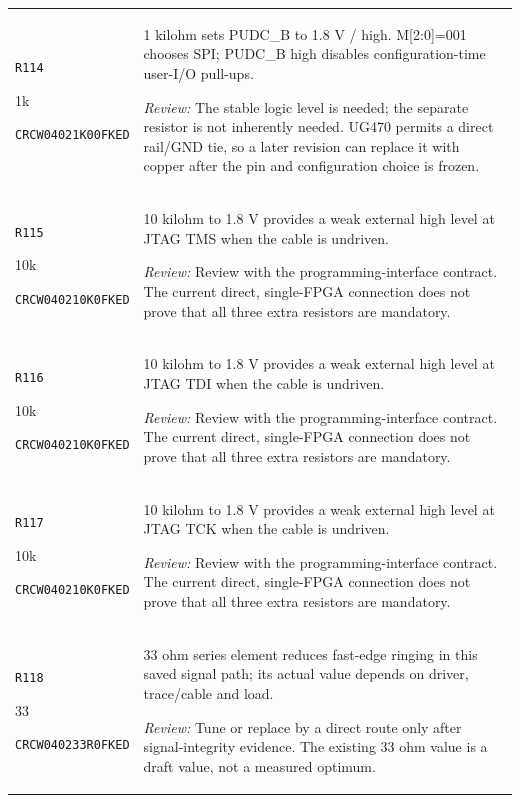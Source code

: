 \documentclass[10pt,a4paper]{article}
\begin{document}
\begin{longtable}{@{}P{46mm}P{117mm}@{}}
\nolinkurl{R114}\par 1k\par\scriptsize \nolinkurl{CRCW04021K00FKED} & 1 kilohm sets PUDC\_B to 1.8 V / high. M[2:0]=001 chooses SPI; PUDC\_B high disables configuration-time user-I/O pull-ups.\par\smallskip\textit{Review:} The stable logic level is needed; the separate resistor is not inherently needed. UG470 permits a direct rail/GND tie, so a later revision can replace it with copper after the pin and configuration choice is frozen. \\
\nolinkurl{R115}\par 10k\par\scriptsize \nolinkurl{CRCW040210K0FKED} & 10 kilohm to 1.8 V provides a weak external high level at JTAG TMS when the cable is undriven.\par\smallskip\textit{Review:} Review with the programming-interface contract. The current direct, single-FPGA connection does not prove that all three extra resistors are mandatory. \\
\nolinkurl{R116}\par 10k\par\scriptsize \nolinkurl{CRCW040210K0FKED} & 10 kilohm to 1.8 V provides a weak external high level at JTAG TDI when the cable is undriven.\par\smallskip\textit{Review:} Review with the programming-interface contract. The current direct, single-FPGA connection does not prove that all three extra resistors are mandatory. \\
\nolinkurl{R117}\par 10k\par\scriptsize \nolinkurl{CRCW040210K0FKED} & 10 kilohm to 1.8 V provides a weak external high level at JTAG TCK when the cable is undriven.\par\smallskip\textit{Review:} Review with the programming-interface contract. The current direct, single-FPGA connection does not prove that all three extra resistors are mandatory. \\
\nolinkurl{R118}\par 33\par\scriptsize \nolinkurl{CRCW040233R0FKED} & 33 ohm series element reduces fast-edge ringing in this saved signal path; its actual value depends on driver, trace/cable and load.\par\smallskip\textit{Review:} Tune or replace by a direct route only after signal-integrity evidence. The existing 33 ohm value is a draft value, not a measured optimum. \\
\end{longtable}\endgroup
\end{document}
